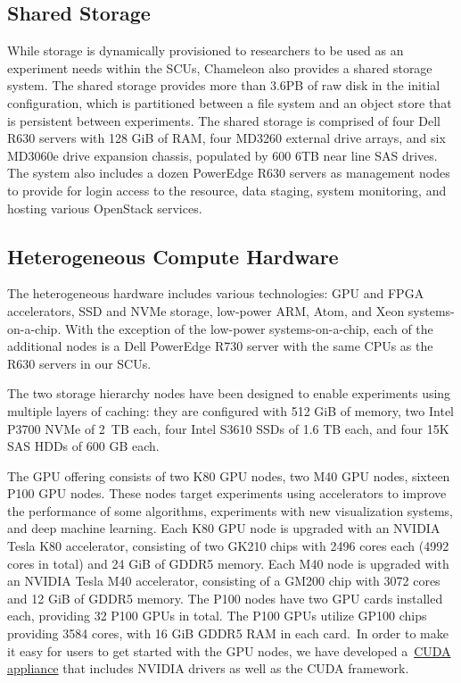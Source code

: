 \subsection{Shared Storage}\label{shared-storage}

While storage is dynamically provisioned to researchers to be used as an
experiment needs within the SCUs, Chameleon also provides a shared
storage system. The shared storage provides more than 3.6PB of raw disk
in the initial configuration, which is partitioned between a file system
and an object store that is persistent between experiments. The shared
storage is comprised of four Dell R630 servers with 128 GiB of RAM, four
MD3260 external drive arrays, and six MD3060e drive expansion chassis,
populated by 600 6TB near line SAS drives. The system also includes a
dozen PowerEdge R630 servers as management nodes to provide for login
access to the resource, data staging, system monitoring, and hosting
various OpenStack services.


\subsection{Heterogeneous Compute
Hardware}\label{heterogeneous-compute-hardware}

The heterogeneous hardware includes various technologies: GPU and FPGA
accelerators, SSD and NVMe storage, low-power ARM, Atom, and Xeon
systems-on-a-chip. With the exception of the low-power
systems-on-a-chip, each of the additional nodes is a Dell PowerEdge R730
server with the same CPUs as the R630 servers in our SCUs.

The two storage hierarchy nodes have been designed to enable experiments
using multiple layers of caching: they are configured with 512 GiB of
memory, two Intel P3700 NVMe of 2~TB each, four Intel S3610 SSDs of 1.6
TB each, and four 15K SAS HDDs of 600 GB each.

The GPU offering consists of two K80 GPU nodes, two M40 GPU nodes,
sixteen P100 GPU nodes. These nodes target experiments using
accelerators to improve the performance of some algorithms, experiments
with new visualization systems, and deep machine learning. Each K80 GPU
node is upgraded with an NVIDIA Tesla K80 accelerator, consisting of two
GK210 chips with 2496 cores each (4992 cores in total) and 24 GiB of
GDDR5 memory. Each M40 node is upgraded with an NVIDIA Tesla M40
accelerator, consisting of a GM200 chip with 3072 cores and 12 GiB of
GDDR5 memory. The P100 nodes have two GPU cards installed each,
providing 32 P100 GPUs in total. The P100 GPUs utilize GP100 chips
providing 3584 cores, with 16 GiB GDDR5 RAM in each card.~In order to
make it easy for users to get started with the GPU nodes, we have
developed a~\href{https://www.chameleoncloud.org/appliances/21/}{CUDA
appliance} that includes NVIDIA drivers as well as the CUDA framework.

